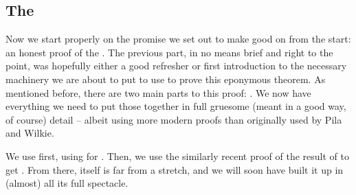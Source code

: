 % 
%
%

\begin{partbacktext}
\part{The \pwT}
\noindent Now we start properly on the promise we set out to make good on from the start: an honest proof of the \pwt. The previous part, in no means brief and right to the point, was hopefully either a good refresher or first introduction to the necessary machinery we are about to put to use to prove this eponymous theorem. As mentioned before, there are two main parts to this proof: . We now have everything we need to put those together in full gruesome (meant in a good way, of course) detail -- albeit using more modern proofs than originally used by Pila and Wilkie.

We use  first, using  for . Then, we use the similarly recent proof of the result of  to get . From there, \pw itself is far from a stretch, and we will soon have built it up in (almost) all its full spectacle.

\end{partbacktext}
